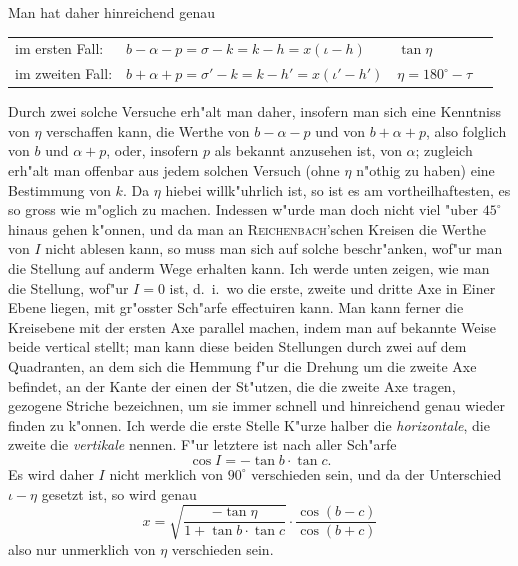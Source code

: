 \documentclass[12pt,a4paper]{article}
\begin{document}
Man hat daher hinreichend genau

\begin{center}
\begin{tabular}{ll@{\quad}l@{\quad}l}
im ersten Fall: & $b - \alpha - p = \sigma - k = k - h = x(\iota - h)$ & $\tan\eta$ \\
im zweiten Fall: & $b + \alpha + p = \sigma' - k = k - h' = x(\iota' - h')$ & $\eta = 180^{\circ} - \tau$
\end{tabular}
\end{center}

Durch zwei solche Versuche erh"alt man daher, insofern man sich eine Kenntniss von $\eta$ verschaffen
kann, die Werthe von $b - \alpha - p$ und von $b + \alpha + p$, also folglich von $b$ und $\alpha + p$, oder, insofern
$p$ als bekannt anzusehen ist, von $\alpha$; zugleich erh"alt man offenbar aus jedem solchen Versuch (ohne
$\eta$ n"othig zu haben) eine Bestimmung von $k$. Da $\eta$ hiebei willk"uhrlich ist, so ist es am vortheilhaftesten,
es so gross wie m"oglich zu machen. Indessen w"urde man doch nicht viel "uber $45^{\circ}$ hinaus gehen k"onnen,
und da man an \textsc{Reichenbach}'schen Kreisen die Werthe von $I$ nicht ablesen kann, so muss man sich
auf solche beschr"anken, wof"ur man die Stellung auf anderm Wege erhalten kann. Ich werde unten zeigen,
wie man die Stellung, wof"ur $I = 0$ ist, d.~i.~wo die erste, zweite und dritte Axe in Einer Ebene liegen,
mit gr"osster Sch"arfe effectuiren kann. Man kann ferner die Kreisebene mit der ersten Axe parallel
machen, indem man auf bekannte Weise beide vertical stellt; man kann diese beiden Stellungen durch
zwei auf dem Quadranten, an dem sich die Hemmung f"ur die Drehung um die zweite Axe befindet,
an der Kante der einen der St"utzen, die die zweite Axe tragen, gezogene Striche bezeichnen, um sie
immer schnell und hinreichend genau wieder finden zu k"onnen. Ich werde die erste Stelle K"urze halber
die \textit{horizontale}, die zweite die \textit{vertikale} nennen. F"ur letztere ist nach aller Sch"arfe
\[\cos I = -\tan b \cdot \tan c.\]
Es wird daher $I$ nicht merklich von $90^{\circ}$ verschieden sein, und da der Unterschied $\iota - \eta$ gesetzt ist,
so wird genau
\[x = \sqrt{\frac{-\tan \eta}{1 + \tan b \cdot \tan c}} \cdot \frac{\cos(b - c)}{\cos(b + c)}\]
also nur unmerklich von $\eta$ verschieden sein.

\newpage
\end{document}
